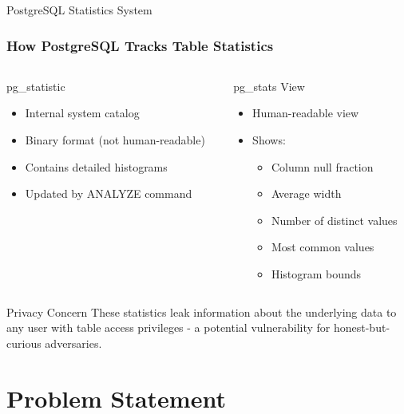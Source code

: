 \documentclass[smaller]{beamer}
\begin{document}
\begin{frame}{PostgreSQL Statistics System}
\frametitle{How PostgreSQL Tracks Table Statistics}

\begin{columns}[T]
\begin{column}{0.5\textwidth}
\begin{block}{pg\_statistic}
\begin{itemize}
    \item Internal system catalog
    \item Binary format (not human-readable)
    \item Contains detailed histograms
    \item Updated by ANALYZE command
\end{itemize}
\end{block}
\end{column}

\begin{column}{0.5\textwidth}
\begin{block}{pg\_stats View}
\begin{itemize}
    \item Human-readable view
    \item Shows:
    \begin{itemize}
        \item Column null fraction
        \item Average width
        \item Number of distinct values
        \item Most common values
        \item Histogram bounds
    \end{itemize}
\end{itemize}
\end{block}
\end{column}
\end{columns}

\vspace{0.5cm}

\begin{alertblock}{Privacy Concern}
These statistics leak information about the underlying data to any user with table access privileges - a potential vulnerability for honest-but-curious adversaries.
\end{alertblock}

\end{frame}

\section{Problem Statement}
\end{document}
